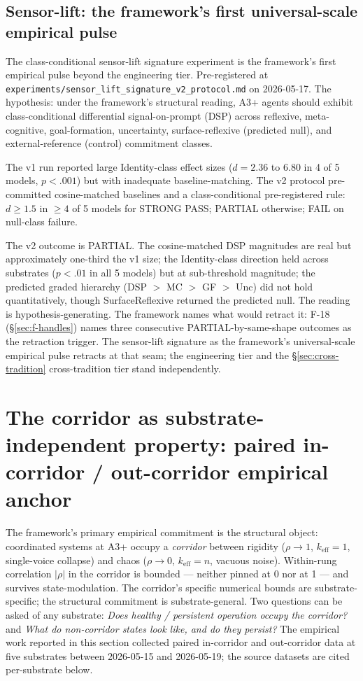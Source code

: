 \documentclass[11pt,a4paper]{article}
\newcommand{\keff}{k_{\text{eff}}}
\begin{document}
\subsection*{Sensor-lift: the framework's first universal-scale empirical pulse}

The class-conditional sensor-lift signature experiment is the framework's first empirical pulse beyond the engineering tier. Pre-registered at \texttt{experiments/sensor\_lift\_signature\_v2\_protocol.md} on 2026-05-17. The hypothesis: under the framework's structural reading, A3+ agents should exhibit class-conditional differential signal-on-prompt (DSP) across reflexive, meta-cognitive, goal-formation, uncertainty, surface-reflexive (predicted null), and external-reference (control) commitment classes.

The v1 run reported large Identity-class effect sizes ($d = 2.36$ to $6.80$ in 4 of 5 models, $p < .001$) but with inadequate baseline-matching. The v2 protocol pre-committed cosine-matched baselines and a class-conditional pre-registered rule: $d \ge 1.5$ in $\ge 4$ of 5 models for STRONG PASS; PARTIAL otherwise; FAIL on null-class failure.

The v2 outcome is PARTIAL. The cosine-matched DSP magnitudes are real but approximately one-third the v1 size; the Identity-class direction held across substrates ($p < .01$ in all 5 models) but at sub-threshold magnitude; the predicted graded hierarchy (DSP $>$ MC $>$ GF $>$ Unc) did not hold quantitatively, though SurfaceReflexive returned the predicted null. The reading is hypothesis-generating. The framework names what would retract it: F-18 (\S\ref{sec:f-handles}) names three consecutive PARTIAL-by-same-shape outcomes as the retraction trigger. The sensor-lift signature as the framework's universal-scale empirical pulse retracts at that seam; the engineering tier and the \S\ref{sec:cross-tradition} cross-tradition tier stand independently.

\section{The corridor as substrate-independent property: paired in-corridor / out-corridor empirical anchor}\label{sec:corridor-empirical}

The framework's primary empirical commitment is the structural object: coordinated systems at A3+ occupy a \emph{corridor} between rigidity ($\rho \to 1$, $\keff = 1$, single-voice collapse) and chaos ($\rho \to 0$, $\keff = n$, vacuous noise). Within-rung correlation $|\rho|$ in the corridor is bounded --- neither pinned at 0 nor at 1 --- and survives state-modulation. The corridor's specific numerical bounds are substrate-specific; the structural commitment is substrate-general. Two questions can be asked of any substrate: \emph{Does healthy / persistent operation occupy the corridor?} and \emph{What do non-corridor states look like, and do they persist?} The empirical work reported in this section collected paired in-corridor and out-corridor data at five substrates between 2026-05-15 and 2026-05-19; the source datasets are cited per-substrate below.
\end{document}
